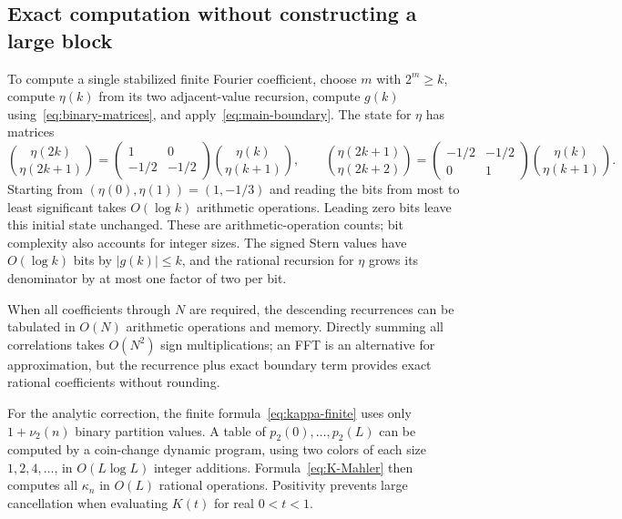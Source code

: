 \documentclass[11pt,a4paper]{article}
\numberwithin{equation}{section}
\theoremstyle{definition}
\theoremstyle{remark}
\newcommand{\vnu}{\nu_2}
\begin{document}
\subsection{Exact computation without constructing a large block}
To compute a single stabilized finite Fourier coefficient, choose $m$ with
$2^m\ge k$, compute $\eta(k)$ from its two adjacent-value recursion, compute
$g(k)$ using~\eqref{eq:binary-matrices}, and apply~\eqref{eq:main-boundary}.
The state for $\eta$ has matrices
\begin{equation}
 \binom{\eta(2k)}{\eta(2k+1)}=
 \begin{pmatrix}1&0\\-1/2&-1/2\end{pmatrix}
 \binom{\eta(k)}{\eta(k+1)},\qquad
 \binom{\eta(2k+1)}{\eta(2k+2)}=
 \begin{pmatrix}-1/2&-1/2\\0&1\end{pmatrix}
 \binom{\eta(k)}{\eta(k+1)}.
 \label{eq:eta-binary-matrices}
\end{equation}
Starting from $(\eta(0),\eta(1))=(1,-1/3)$ and reading the bits from most to
least significant takes $O(\log k)$ arithmetic operations. Leading zero bits
leave this initial state unchanged. These are arithmetic-operation counts;
bit complexity also accounts for integer sizes. The signed Stern values have
$O(\log k)$ bits by $|g(k)|\le k$, and the rational recursion for $\eta$ grows
its denominator by at most one factor of two per bit.

When all coefficients through $N$ are required, the descending recurrences can
be tabulated in $O(N)$ arithmetic operations and memory. Directly summing all
correlations takes $O(N^2)$ sign multiplications; an FFT is an alternative for
approximation, but the recurrence plus exact boundary term provides exact
rational coefficients without rounding.

For the analytic correction, the finite formula~\eqref{eq:kappa-finite} uses only
$1+\vnu(n)$ binary partition values. A table of $p_2(0),\ldots,p_2(L)$ can be
computed by a coin-change dynamic program, using two colors of each size
$1,2,4,\ldots$, in $O(L\log L)$ integer additions. Formula~\eqref{eq:K-Mahler}
then computes all $\kappa_n$ in $O(L)$ rational operations. Positivity prevents
large cancellation when evaluating $K(t)$ for real $0<t<1$.
\end{document}

